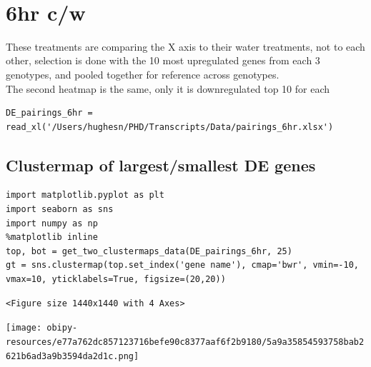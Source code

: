 \documentclass[11pt]{article}
\begin{document}
\clearpage\\

\section{6hr c/w}
\label{sec:orgd5e347e}

These treatments are comparing the X axis to their water treatments, not to each other, selection is done with the 10 most upregulated genes from each 3 genotypes, and pooled together for reference across genotypes.\\
 The second heatmap is the same, only it is downregulated top 10 for each\\

\begin{verbatim}
DE_pairings_6hr = read_xl('/Users/hughesn/PHD/Transcripts/Data/pairings_6hr.xlsx')
\end{verbatim}

\subsection{Clustermap of largest/smallest DE genes}
\label{sec:org54e8b83}

\begin{verbatim}
import matplotlib.pyplot as plt
import seaborn as sns
import numpy as np
%matplotlib inline
top, bot = get_two_clustermaps_data(DE_pairings_6hr, 25)
gt = sns.clustermap(top.set_index('gene name'), cmap='bwr', vmin=-10, vmax=10, yticklabels=True, figsize=(20,20))
\end{verbatim}

\begin{verbatim}
<Figure size 1440x1440 with 4 Axes>
\end{verbatim}


\begin{center}
\texttt{[image: obipy-resources/e77a762dc857123716befe90c8377aaf6f2b9180/5a9a35854593758bab2621b6ad3a9b3594da2d1c.png]}
\end{center}
\end{document}
